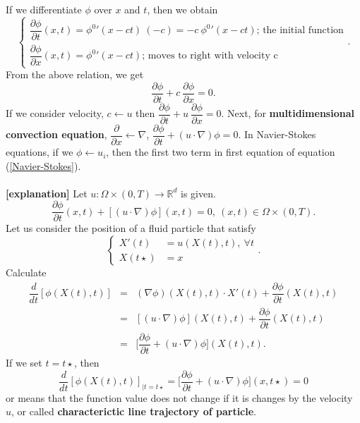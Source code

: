 \documentclass[a4paper,10pt]{article}
\newcommand{\R}{\mathbb{R}}
\begin{document}
If we differentiate $ \phi $ over $ x $ and $ t $, then we obtain 
\[ \begin{cases}
\dfrac{\partial \phi}{\partial t} (x,t) = \phi^{0}\prime (x-ct) \ (-c) = -c \ \phi^{0}\prime (x-ct) \text{; the initial function}\\
\dfrac{\partial \phi}{\partial x} (x,t) = \phi^{0}\prime (x-ct) \text{; moves to right with velocity c}
\end{cases}. \]
From the above relation, we get 
\[ \dfrac{\partial \phi}{\partial t} + c \ \dfrac{\partial \phi}{\partial x} = 0. \]
If we consider velocity, $ c \leftarrow u $ then $ \dfrac{\partial \phi}{\partial t} + u \ \dfrac{\partial \phi}{\partial x} = 0 $. Next, for \textbf{multidimensional convection equation}, $ \dfrac{\partial}{\partial x} \leftarrow \nabla $, $ \dfrac{\partial \phi}{\partial t} + (u \cdot \nabla) \phi= 0 $. In Navier-Stokes equations, if we $ \phi \leftarrow u_{i} $, then the first two term in first equation of equation (\ref{Navier-Stokes}). \\ \\
\textbf{[explanation]} Let $ u : \Omega \times (0,T) \rightarrow \R^d $ is given.
\[ \dfrac{\partial \phi}{\partial t} (x,t) + [(u \cdot \nabla) \phi](x,t) = 0 , \ (x,t) \in \Omega \times (0,T). \]
Let us consider the position of a fluid particle that satisfy
\[ \begin{cases}
X\prime (t) &= u (X(t),t), \ \forall t \\
X(t\star) &= x
\end{cases}. \]
Calculate
\begin{eqnarray}\nonumber
\dfrac{d}{dt}[\phi(X(t),t)] &=& (\nabla \phi)(X(t),t) \cdot X \prime (t) + \dfrac{\partial \phi}{\partial t}(X(t),t) \\ \nonumber
&=& [(u \cdot \nabla)\phi](X(t),t) + \dfrac{\partial \phi}{\partial t}(X(t),t) \\ \nonumber
&=& \Big[ \dfrac{\partial \phi}{\partial t}+(u \cdot \nabla)\phi \Big] (X(t),t).
\end{eqnarray}
If we set $ t=t\star $, then
\[ \dfrac{d}{dt}[\phi(X(t),t)]_{|t=t\star} = \Big[ \dfrac{\partial \phi}{\partial t}+(u \cdot \nabla)\phi \Big] (x,t\star) = 0 \]
or means that the function value does not change if it is changes by the velocity $ u $, or called \textbf{characterictic line trajectory of particle}.
\end{document}
